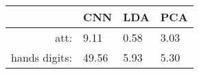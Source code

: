 \begin{tabular}{|r|l|l|l|}
  \hline
    & CNN & LDA & PCA \\
  \hline
  att: & 9.11 & 0.58 & 3.03 \\
  \hline
  hands digits: & 49.56 & 5.93 & 5.30 \\
  \hline
\end{tabular}
